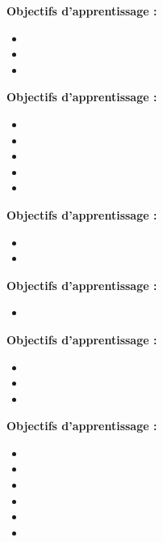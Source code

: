 \par\noindent\textbf{Objectifs d'apprentissage :}
\begin{itemize}
    \item \useobj[C4D2bc]
    \item \useobj[C4D2bd]
    \item \useobj[C4D2be]
\end{itemize}
\endsequence

\par\noindent\textbf{Objectifs d'apprentissage :}
\begin{itemize}
    \item \useobj[C4E2aa]
    \item \useobj[C4E2ab]
    \item \useobj[C4E2ac]
    \item \useobj[C4E2ad]
    \item \useobj[C4E2ae]
\end{itemize}
\endsequence

\endlevel

\par\noindent\textbf{Objectifs d'apprentissage :}
\begin{itemize}
    \item \useobj[C4A3aa]
    \item \useobj[C4A3ab]
\end{itemize}
\endsequence

\par\noindent\textbf{Objectifs d'apprentissage :}
\begin{itemize}
    \item \useobj[C4B3ca]
\end{itemize}
\endsequence

\par\noindent\textbf{Objectifs d'apprentissage :}
\begin{itemize}
    \item \useobj[C4A3ee]
    \item \useobj[C4A3ea]
    \item \useobj[C4A3eb]
\end{itemize}
\endsequence

\par\noindent\textbf{Objectifs d'apprentissage :}
\begin{itemize}
    \item \useobj[C4C3aa]
    \item \useobj[C4C3ab]
    \item \useobj[C4C3ac]
    \item \useobj[C4C3ad]
    \item \useobj[C4C3ae]
    \item \useobj[C4D3aa]
\end{itemize}
\endsequence

